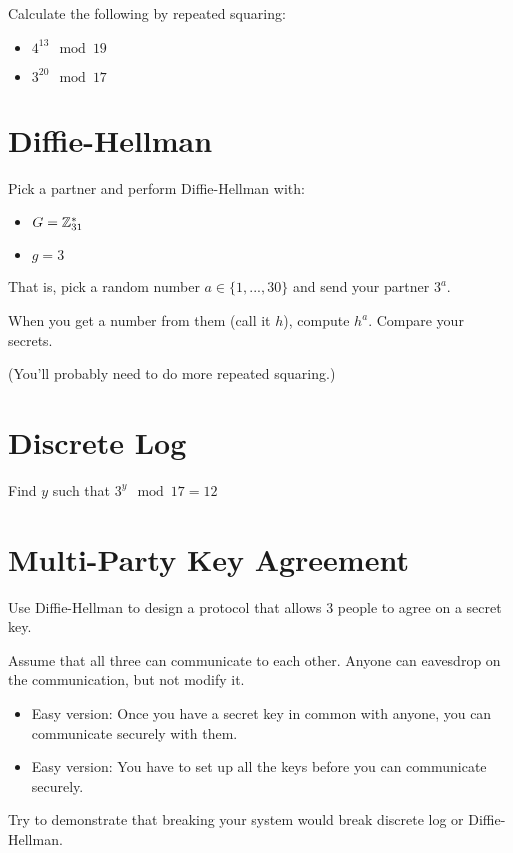 \documentclass[12pt]{article}
\begin{document}
Calculate the following by repeated squaring:

\begin{itemize}
\item $4^{13} \mod 19$
\item $3^{20} \mod 17$
\end{itemize}


\section{Diffie-Hellman}

Pick a partner and perform Diffie-Hellman with:

\begin{itemize}
\item $G = \mathbb{Z}_{31}^*$
\item $g = 3$
\end{itemize}

That is, pick a random number $a \in \{1, ..., 30\}$ and send your partner $3^{a}$.

When you get a number from them (call it $h$), compute $h^a$. Compare your secrets.

(You'll probably need to do more repeated squaring.)

\section{Discrete Log}

Find $y$ such that $3^{y} \mod 17 = 12$

\section{Multi-Party Key Agreement}

Use Diffie-Hellman to design a protocol that allows 3 people to agree on a secret key.

Assume that all three can communicate to each other. Anyone can eavesdrop on the communication, but not modify it.

\begin{itemize}
\item Easy version: Once you have a secret key in common with anyone, you can communicate securely with them.
\item Easy version: You have to set up all the keys before you can communicate securely.
\end{itemize}


Try to demonstrate that breaking your system would break discrete log or Diffie-Hellman.
\end{document}
